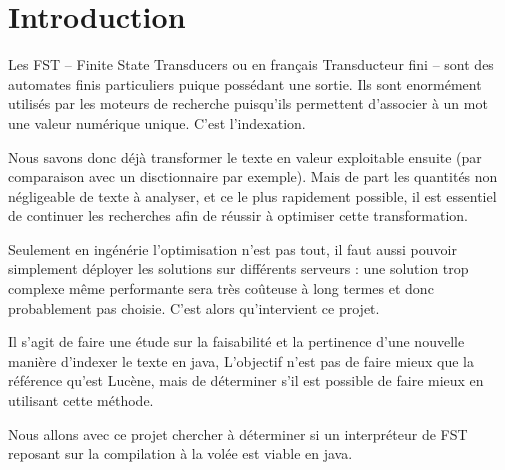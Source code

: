 

\usepackage{amsmath}



\maketitle

\newpage
\clearpage
{}
\setcounter{page}{1}
\footercenter{\textbf{\thepage}}

\hypertarget{Contents}{}
\tableofcontents
\newpage
\lstlistoflistings
\newpage
\listoftables
\newpage
\listoffigures

\newpage
\clearpage
{}
\setcounter{page}{1}

\section*{Introduction}

Les FST -- Finite State Transducers ou en français Transducteur fini -- sont des automates
finis particuliers puique possédant une sortie. Ils sont enormément utilisés par les
moteurs de recherche puisqu'ils permettent d'associer à un mot une valeur numérique
unique. C'est l'indexation.


Nous savons donc déjà transformer le texte en valeur exploitable ensuite
(par comparaison avec un disctionnaire par exemple).
Mais de part les quantités non négligeable de texte à analyser, et ce le plus rapidement
possible, il est essentiel de continuer les recherches afin de réussir à optimiser
cette transformation.


Seulement en ingénérie l'optimisation n'est pas tout, il faut aussi pouvoir simplement déployer les
solutions sur différents serveurs : une solution trop complexe même performante sera très
coûteuse à long termes et donc probablement pas choisie.
C'est alors qu'intervient ce projet.


Il s'agit de faire une étude sur la faisabilité et la pertinence d'une nouvelle manière
d'indexer le texte en java, L'objectif n'est pas de faire mieux que la référence qu'est Lucène,
mais de déterminer s'il est possible de faire mieux en utilisant cette méthode.\newline


Nous allons avec ce projet chercher à déterminer si un interpréteur de FST reposant sur la
compilation à la volée est viable en java.

